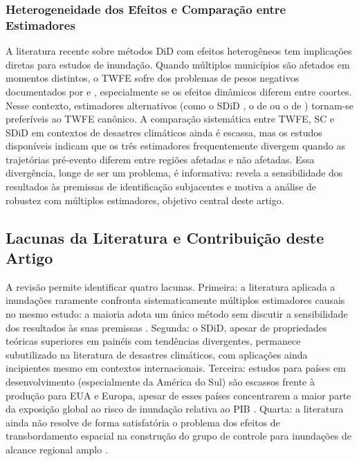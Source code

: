 \documentclass[a4paper,12pt]{article}
\begin{document}
\subsubsection{Heterogeneidade dos Efeitos e Comparação entre Estimadores}

A literatura recente sobre métodos DiD com efeitos heterogêneos tem implicações diretas
para estudos de inundação. Quando múltiplos municípios são afetados em momentos
distintos, o TWFE sofre dos problemas de pesos negativos documentados por
 e , especialmente se os
efeitos dinâmicos diferem entre coortes. Nesse contexto, estimadores alternativos (como
o SDiD \cite{arkhangelsky2021}, o de  ou o de
) tornam-se preferíveis ao TWFE canônico. A comparação
sistemática entre TWFE, SC e SDiD em contextos de desastres climáticos ainda é escassa,
mas os estudos disponíveis indicam que os três estimadores frequentemente divergem
quando as trajetórias pré-evento diferem entre regiões afetadas e não afetadas. Essa
divergência, longe de ser um problema, é informativa: revela a sensibilidade dos resultados
às premissas de identificação subjacentes e motiva a análise de robustez com múltiplos
estimadores, objetivo central deste artigo.

\subsection{Lacunas da Literatura e Contribuição deste Artigo}
\label{sub:lacunas}

A revisão permite identificar quatro lacunas. Primeira: a literatura aplicada a inundações
raramente confronta sistematicamente múltiplos estimadores causais no mesmo estudo: a
maioria adota um único método sem discutir a sensibilidade dos resultados às suas
premissas \cite{botzen2019}. Segunda: o SDiD, apesar de propriedades teóricas superiores
em painéis com tendências divergentes, permanece subutilizado na literatura de desastres
climáticos, com aplicações ainda incipientes mesmo em contextos internacionais. Terceira:
estudos para países em desenvolvimento (especialmente da América do Sul) são
escassos frente à produção para EUA e Europa, apesar de esses países concentrarem a
maior parte da exposição global ao risco de inundação relativa ao PIB
\cite{rentschler2022, mcdermott2022}. Quarta: a literatura ainda não resolve de forma
satisfatória o problema dos efeitos de transbordamento espacial na construção do grupo de
controle para inundações de alcance regional amplo \cite{sakaguchi2026, goujon2024}.
\end{document}
